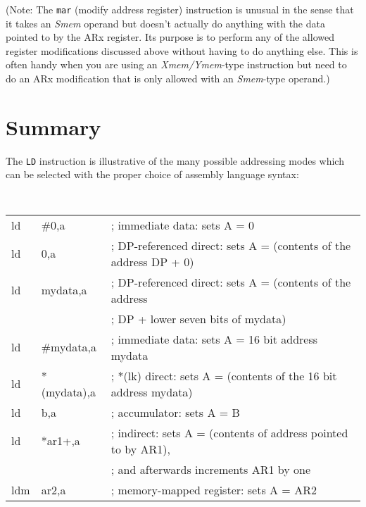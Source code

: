 \documentclass[11pt]{handout}
\begin{document}
(Note:  The {\tt mar} (modify address register) instruction is unusual in
the sense that it takes an {\it Smem} operand but doesn't actually do
anything with the data pointed to by the ARx register.  Its purpose
is to perform any of the allowed register modifications discussed above
without having to do anything else.  This is often handy when you are using
an {\it Xmem/Ymem}-type instruction but need to do an ARx modification that
is only allowed with an {\it Smem}-type operand.)



\section{Summary}

The {\tt LD} instruction is illustrative of the many possible addressing
modes which can be selected with the proper choice of assembly language
syntax:

{\tt
\begin{tabular}{@{\hspace{0.2in}}l@{\hspace{0.3in}}l@{\hspace{0.2in}}l}
ld   & \#0,a       & ; immediate data:  sets A = 0\\
ld   & 0,a         & ; DP-referenced direct:  sets A = (contents of the address DP + 0)\\
ld   & mydata,a    & ; DP-referenced direct:  sets A = (contents of the address\\
     &             & ; \hspace{0.3in} DP + lower seven bits of mydata)\\
ld   & \#mydata,a  & ; immediate data:  sets A = 16 bit address mydata\\
ld   & *(mydata),a & ; *(lk) direct:  sets A = (contents of the 16 bit address mydata)\\
ld   & b,a         & ; accumulator:  sets A = B\\
ld   & *ar1+,a     & ; indirect:  sets A = (contents of address pointed to by AR1),\\
     &             & ; \hspace{0.3in} and afterwards increments AR1 by one\\
ldm  & ar2,a       & ; memory-mapped register:  sets A = AR2\\
\end{tabular}
}
\end{document}
